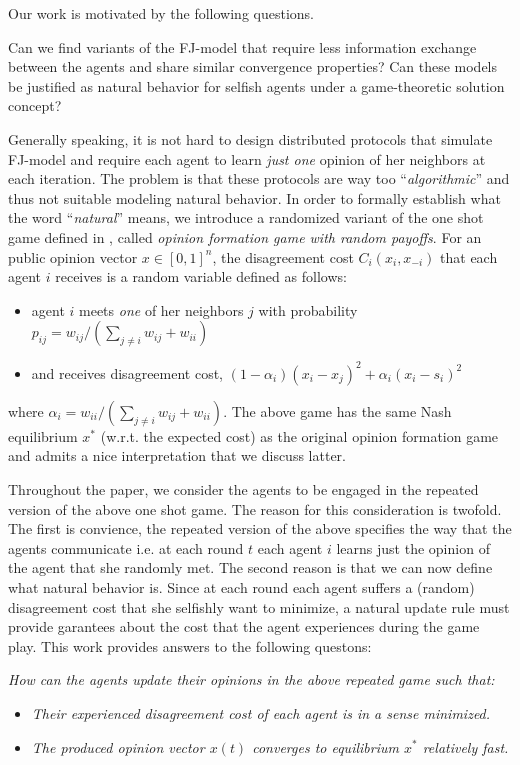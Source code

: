 Our work is motivated by the following questions.
\begin{question}
Can we find variants of the FJ-model that
require less information exchange between the agents
and share similar convergence properties?
Can these models be justified as natural behavior for selfish
agents under a game-theoretic solution concept?
\end{question}

Generally speaking, it is not hard to
design distributed protocols that simulate FJ-model
and require each agent to learn \emph{just one} opinion
of her neighbors at each iteration. The problem is that these protocols
are way too \enquote{\emph{algorithmic}} and thus not suitable modeling
natural behavior. In order to formally establish what
the word \enquote{\emph{natural}} means, we introduce a randomized
variant of the one shot game defined in \cite{BKO11},
called \emph{opinion formation game with random payoffs}.
For an public opinion vector $x \in [0,1]^n$, the disagreement
cost $C_i(x_i,x_{-i})$ that each agent $i$ receives is
a random variable defined as follows:
\begin{itemize}
 \item agent $i$ meets \emph{one} of her neighbors $j$ with probability
 $p_{ij}=w_{ij}/(\sum_{j\neq i}w_{ij}+w_{ii})$
 \item and receives disagreement cost, $(1-\alpha_i)(x_i-x_j)^2 + \alpha_i(x_i-s_i)^2$
\end{itemize}
where $\alpha_i=w_{ii}/(\sum_{j\neq i}w_{ij}+w_{ii})$. The above game
has the same Nash equilibrium $x^*$ (w.r.t. the expected cost) as
the original opinion formation game and admits a nice interpretation
that we discuss latter.

Throughout the paper, we consider the agents to be engaged in the repeated
version of the above one shot game. The reason for this
consideration is twofold. The first is convience, the repeated
version of the above specifies the way that the agents communicate i.e.
at each round $t$ each agent $i$ learns just the opinion
of the agent that she randomly met. The second reason is that we can now define
what natural behavior is. Since at each round each agent
suffers a (random) disagreement cost that she selfishly want
to minimize, a natural update rule must provide garantees about
the cost that the agent experiences during the game play.
This work provides answers to the following questons:

\emph{How can the agents update their opinions in the above
repeated game such that:}
\begin{itemize}
\item \emph{Their experienced disagreement cost of each agent is in a sense minimized.}
\item \emph{The produced opinion vector $x(t)$ converges to equilibrium $x^*$
 relatively fast.}
\end{itemize}

